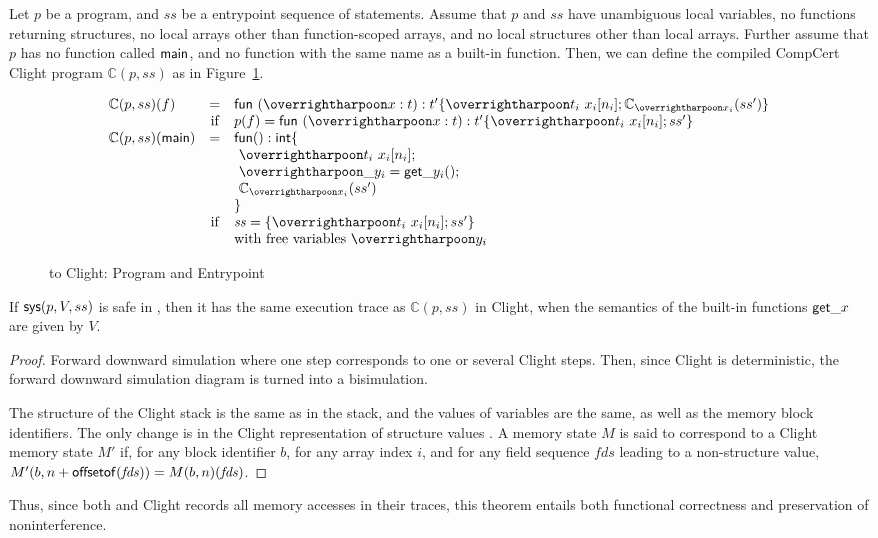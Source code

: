Let $p$ be a  program, and $ss$ be a  entrypoint sequence of
statements. Assume that $p$ and $ss$ have unambiguous local variables,
no functions returning structures, no local arrays other than
function-scoped arrays, and no local structures other than local
arrays. Further assume that $p$ has no function called $\text{\textsf{main}}$,
and no function with the same name as a built-in function. Then, we
can define the compiled CompCert Clight program $\mathbb C(p, ss)$ as
in Figure~\ref{fig:cstar-2-to-clight-prog}.
\begin{figure}
\[
\begin{array}{lcl}
  \mathbb C(p, ss)(f) & = & \kw{fun} ~ (\ls{x : t}) : t' \{ \ls{t_i ~ x_i[n_i]} ; \mathbb C_{\ls{x_i}}(ss') \} \\
  & \text{if} & p(f) = \kw{fun} ~ (\ls{x : t}) : t' \{ \ls{t_i ~ x_i[n_i]} ; ss' \} \\
  \mathbb C(p, ss)(\kw{main}) & = & \kw{fun} () : \kw{int} \{ \\
  & & ~ \ls{t_i ~ x_i[n_i]} ; \\
  & & ~ \ls{\_y_i = \kw{get}\_y_i()} ; \\
  & & ~ \mathbb C_{\ls{x_i}}(ss') \\
  & & \} \\
  & \text{if} & \mathit{ss} = \{ \ls{t_i ~ x_i[n_i]} ; ss' \} \\
  & & \text{with free variables} ~ \ls{y_i}
\end{array}
\]
\caption{ to Clight: Program and Entrypoint}
\label{fig:cstar-2-to-clight-prog}
\end{figure}

\begin{theorem}
  If $\text{\textsf{sys}}(p, V, ss)$ is safe in , then it has the same execution
  trace as $\mathbb C(p, ss)$ in Clight, when the semantics of the
  built-in functions $\text{\textsf{get}}\_x$ are given by $V$.
\end{theorem}
\begin{proof}
  Forward downward simulation where one  step corresponds to one or
  several Clight steps. Then, since Clight is deterministic, the
  forward downward simulation diagram is turned into a bisimulation.

  The structure of the Clight stack is the same as in the  stack,
  and the values of variables are the same, as well as the memory
  block identifiers. The only change is in the Clight representation
  of  structure values . A  memory state $M$ is said to
  correspond to a Clight memory state $M'$ if, for any block
  identifier $b$, for any array index $i$, and for any field sequence
  $\mathit{fds}$ leading to a non-structure value, $M'(b, n +
  \text{\textsf{offsetof}}(\mathit{fds})) = M(b, n)(\mathit{fds})$.
\end{proof}

Thus, since both  and Clight records all memory accesses in their
traces, this theorem entails both functional correctness and
preservation of noninterference.
